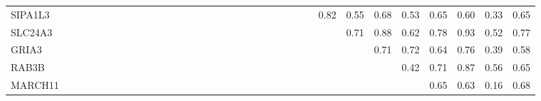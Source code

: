 \begin{longtable}{lrrrrrrrrrrrrrrrrrrrrrrrrrrrrrrrrr}
SIPA1L3 &             &              &              &              &               &           &            &             &              &             &           &             &              &            &              &              &              &             &               &              &              &            &             &            &               &          0.82 &        0.55 &        0.68 &          0.53 &          0.65 &       0.60 &          0.33 &       0.65 \\
SLC24A3 &             &              &              &              &               &           &            &             &              &             &           &             &              &            &              &              &              &             &               &              &              &            &             &            &               &               &        0.71 &        0.88 &          0.62 &          0.78 &       0.93 &          0.52 &       0.77 \\
GRIA3   &             &              &              &              &               &           &            &             &              &             &           &             &              &            &              &              &              &             &               &              &              &            &             &            &               &               &             &        0.71 &          0.72 &          0.64 &       0.76 &          0.39 &       0.58 \\
RAB3B   &             &              &              &              &               &           &            &             &              &             &           &             &              &            &              &              &              &             &               &              &              &            &             &            &               &               &             &             &          0.42 &          0.71 &       0.87 &          0.56 &       0.65 \\
MARCH11 &             &              &              &              &               &           &            &             &              &             &           &             &              &            &              &              &              &             &               &              &              &            &             &            &               &               &             &             &               &          0.65 &       0.63 &          0.16 &       0.68 \\

\end{longtable}
